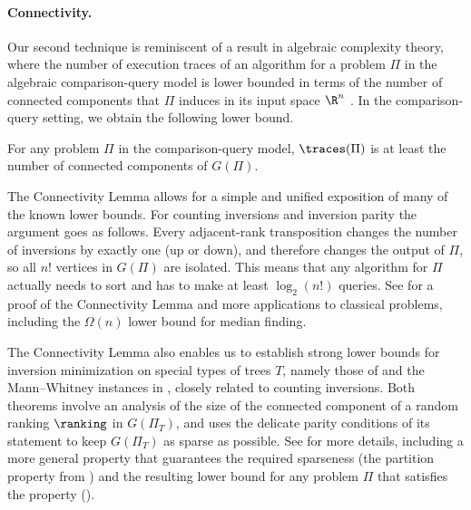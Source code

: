 \paragraph{Connectivity.} Our second technique is reminiscent of a result in algebraic complexity theory, where the number of execution traces of an algorithm for a problem $\Pi$ in the algebraic comparison-query model is lower bounded in terms of the number of connected components that $\Pi$ induces in its input space $\R^n$ \cite{Ben-Or1983}. In the comparison-query setting, we obtain the following lower bound.

\begin{lemma}\label{lemma:connectivity} For any problem $\Pi$ in the comparison-query model, $\traces(\Pi)$ is at least the number of connected components of $G(\Pi)$.
\end{lemma}

The Connectivity Lemma allows for a simple and unified exposition of many of the known lower bounds. For counting inversions and inversion parity the argument goes as follows. Every adjacent-rank transposition changes the number of inversions by exactly one (up or down), and therefore changes the output of $\Pi$, so all $n!$ vertices in $G(\Pi)$ are isolated. This means that any algorithm for $\Pi$ actually needs to sort and has to make at least $\log_2(n!)$ queries. See  for a proof of the Connectivity Lemma and more applications to classical problems, including the $\Omega(n)$ lower bound for median finding.

The Connectivity Lemma also enables us to establish strong lower bounds for inversion minimization on special types of trees $T$, namely those of  and the Mann--Whitney instances in , closely related to counting inversions. Both theorems involve an analysis of the size of the connected component of a random ranking $\ranking$ in $G(\Pi_T)$, and  uses the delicate parity conditions of its statement to keep $G(\Pi_T)$ as sparse as possible. See  for more details, including a more general property that guarantees the required sparseness (the partition property from ) and the resulting lower bound for any 
%
problem $\Pi$ that satisfies the property (). 

